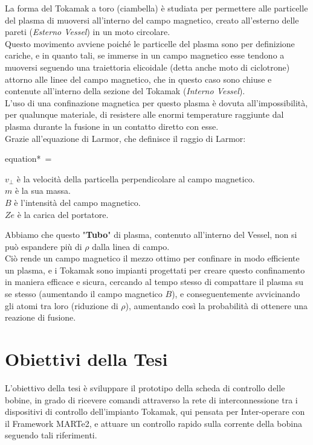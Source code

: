 \noindent
La forma del Tokamak a toro (ciambella) è studiata per permettere alle particelle del plasma di muoversi all'interno del campo magnetico, creato all'esterno delle pareti (\textit{Esterno Vessel}) in un moto circolare.\\
Questo movimento avviene poiché le particelle del plasma sono per definizione cariche, e in quanto tali, se immerse in un campo magnetico esse tendono a muoversi seguendo una traiettoria elicoidale (detta anche moto di ciclotrone) attorno alle linee del campo magnetico, che in questo caso sono chiuse e contenute all'interno della sezione del Tokamak (\textit{Interno Vessel}).\\
L'uso di una confinazione magnetica per questo plasma è dovuta all'impossibilità, per qualunque materiale, di resistere alle enormi temperature raggiunte dal plasma durante la fusione in un contatto diretto con esse.\\
Grazie all'equazione di Larmor, che definisce il raggio di Larmor:\\
\begin{vwcol}[widths={0.3,0.7}, sep=8mm, rule=1px]
	\begin{empheq}[box=\mathCalc]{equation*} \label{eq:Larmor}
		{\displaystyle \,\rho ={}}
	\end{empheq}
	\newpage %
	\begin{spacing}{1.25}
		{\footnotesize
			$ {\displaystyle v_{\perp }} $ è la velocità della particella perpendicolare al campo magnetico.\\
			$ {\displaystyle m} $ è la sua massa.\\
			$ {\displaystyle B} $ è l'intensità del campo magnetico.\\
			$ {\displaystyle Ze} $ è la carica del portatore.
		}
	\end{spacing}
\end{vwcol}

\noindent
Abbiamo che questo "\textbf{Tubo}" di plasma, contenuto all'interno del Vessel, non si può espandere più di $ {\displaystyle \rho } $ dalla linea di campo.\\
Ciò rende un campo magnetico il mezzo ottimo per confinare in modo efficiente un plasma, e i Tokamak sono impianti progettati per creare questo confinamento in maniera efficace e sicura, cercando al tempo stesso di compattare il plasma su se stesso (aumentando il campo magnetico $ {\displaystyle B} $), e conseguentemente avvicinando gli atomi tra loro (riduzione di $ {\displaystyle \rho } $), aumentando così la probabilità di ottenere una reazione di fusione. 

\section*{Obiettivi della Tesi}
L'obiettivo della tesi è sviluppare il prototipo della scheda di controllo delle bobine, in grado di ricevere comandi attraverso la rete di interconnessione tra i dispositivi di controllo dell'impianto Tokamak, qui pensata per Inter-operare con il Framework MARTe2, e attuare un controllo rapido sulla corrente della bobina seguendo tali riferimenti.\\